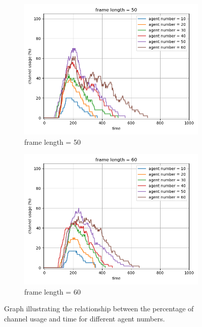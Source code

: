 \begin{figure}[htbp]
    \vspace{1cm}
    
    \begin{subfigure}[t]{0.45\linewidth}
        \centering
        \includegraphics[width=\linewidth]{figures/channel_usage_frame50.png}
        \caption{frame length = 50}
        \label{fig:framepercent5}
    \end{subfigure}
    \hfill
    \begin{subfigure}[t]{0.45\linewidth}
        \centering
        \includegraphics[width=\linewidth]{figures/channel_usage_frame60.png}
        \caption{frame length = 60}
        \label{fig:framepercent6}
    \end{subfigure}
    
    \caption{Graph illustrating the relationship between the percentage of channel usage and time for different agent numbers.}
    \label{fig:channelpercent}
\end{figure}


